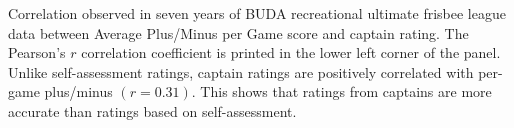 Correlation observed in seven years of BUDA recreational ultimate frisbee league data between Average Plus/Minus per Game score and captain rating.  The Pearson's $r$ correlation coefficient is printed in the lower left corner of the panel. Unlike self-assessment ratings, captain ratings are positively correlated with per-game plus/minus $(r = 0.31)$. This shows that ratings from captains are more accurate than ratings based on self-assessment. \label{fig:correlation_captain}